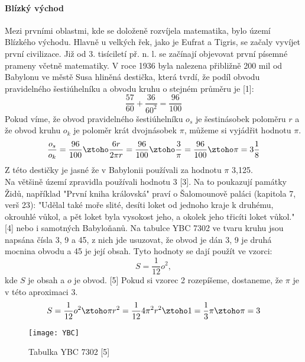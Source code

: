 \documentclass[rocnikovka]{gzwroc} %
\begin{document}
\paragraph{Blízký východ}
Mezi prvními oblastmi, kde se doloženě rozvíjela matematika, bylo území Blízkého východu. Hlavně u velkých řek, jako je Eufrat a Tigris, se začaly vyvíjet první civilizace. Již od 3. tisíciletí př. n. l. se začínají objevovat první písemné prameny včetně matematiky. 
V roce 1936 byla nalezena přibližně 200 mil od Babylonu ve městě Susa hliněná destička, která tvrdí, že podíl obvodu pravidelného šestiúhelníku a obvodu kruhu o stejném průměru je [1]:
$$
\frac{57}{60}+\frac{36}{60^2}=\frac{96}{100}
$$
Pokud víme, že obvod pravidelného šestiúhelníku $o_s$ je šestinásobek poloměru $r$ a že obvod kruhu $o_k$ je poloměr krát dvojnásobek $\pi$, můžeme si vyjádřit hodnotu $\pi$.
\begin{equation}
\frac{o_s}{o_k}=\frac{96}{100} \ztoho \frac{6r}{2\pi r}=\frac{96}{100} \ztoho \frac{3}{\pi}=\frac{96}{100} \ztoho\pi=3\frac{1}{8}
\end{equation}
Z této destičky je jasné že v Babylonii používali za hodnotu $\pi$ 3,125.\\
Na většině území zpravidla používali hodnotu 3 [3]. Na to poukazují památky Židů, například "První kniha královská" praví o Šalomounově paláci (kapitola 7, verš 23): "Udělal také moře slité, desíti loket od jednoho kraje k druhému, okrouhlé vůkol, a pět loket byla vysokost jeho, a okolek jeho třicíti loket vůkol." [4] nebo i samotných Babyloňanů. Na tabulce YBC 7302 ve tvaru kruhu jsou napsána čísla 3, 9 a 45, z nich jde usuzovat, že obvod je dán 3, 9 je druhá mocnina obvodu a 45 je její obsah. Tyto hodnoty se dají použít ve vzorci:
\begin{equation}
S=\frac{1}{12}o^2,
\end{equation}
kde $S$ je obsah a $o$ je obvod. [5] Pokud si vzorec 2 rozepíšeme, dostaneme, že $\pi$ je v této aproximaci 3.
$$
S=\frac{1}{12}o^2 \ztoho \pi r^2=\frac{1}{12}4\pi^2r^2 \ztoho 1=\frac{1}{3}\pi \ztoho \pi=3
$$
\begin{figure}[!ht]
\texttt{[image: YBC]}
\caption{Tabulka YBC 7302 [5]}
\label{fig:kruh}
\end{figure}
\end{document}
